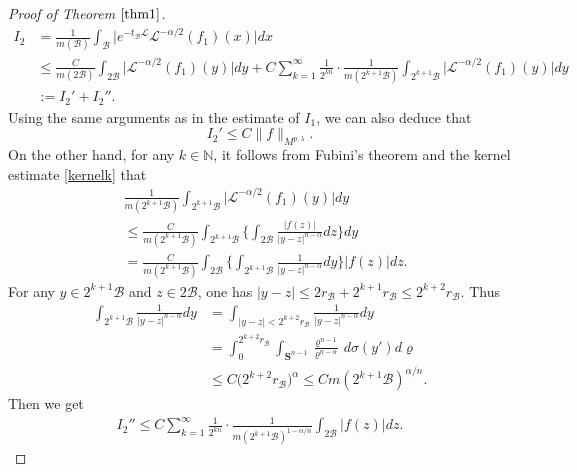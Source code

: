 \documentclass[10pt, reqno]{amsart}
\theoremstyle{definition}
\theoremstyle{remark}
\numberwithin{equation}{section}
\begin{document}
\begin{proof}[Proof of Theorem $\ref{thm1}$]
\begin{equation*}
\begin{split}
I_2&=\frac{1}{m(\mathcal{B})}\int_{\mathcal{B}}\big|e^{-t_{\mathcal{B}}\mathcal{L}}\mathcal{L}^{-\alpha/2}(f_1)(x)\big|dx\\
&\leq\frac{C}{m(2\mathcal{B})}\int_{2\mathcal{B}}\big|\mathcal{L}^{-\alpha/2}(f_1)(y)\big|dy
+C\sum_{k=1}^{\infty}\frac{1}{2^{kn}}\cdot\frac{1}{m(2^{k+1}\mathcal{B})}\int_{2^{k+1}\mathcal{B}}\big|\mathcal{L}^{-\alpha/2}(f_1)(y)\big|dy\\
&:=I_2'+I_2''.
\end{split}
\end{equation*}
Using the same arguments as in the estimate of $I_1$, we can also deduce that
\begin{equation*}
I_2'\leq C\big\|f\big\|_{M^{p,\lambda}}.
\end{equation*}
On the other hand, for any $k\in \mathbb{N}$, it follows from Fubini's theorem and the kernel estimate \eqref{kernelk} that
\begin{equation*}
\begin{split}
&\frac{1}{m(2^{k+1}\mathcal{B})}\int_{2^{k+1}\mathcal{B}}\big|\mathcal{L}^{-\alpha/2}(f_1)(y)\big|dy\\
&\leq \frac{C}{m(2^{k+1}\mathcal{B})}\int_{2^{k+1}\mathcal{B}}\bigg\{\int_{2\mathcal{B}}\frac{|f(z)|}{|y-z|^{n-\alpha}}dz\bigg\}dy\\
&=\frac{C}{m(2^{k+1}\mathcal{B})}\int_{2\mathcal{B}}\bigg\{\int_{2^{k+1}\mathcal{B}}\frac{1}{|y-z|^{n-\alpha}}dy\bigg\}|f(z)|dz.
\end{split}
\end{equation*}
For any $y\in 2^{k+1}\mathcal{B}$ and $z\in 2\mathcal{B}$, one has $|y-z|\leq 2r_{\mathcal{B}}+2^{k+1}r_{\mathcal{B}}\leq 2^{k+2}r_{\mathcal{B}}$. Thus
\begin{equation}\label{wang2}
\begin{split}
\int_{2^{k+1}\mathcal{B}}\frac{1}{|y-z|^{n-\alpha}}dy
&=\int_{|y-z|<2^{k+2}r_{\mathcal{B}}}\frac{1}{|y-z|^{n-\alpha}}dy\\
&=\int_0^{2^{k+2}r_{\mathcal{B}}}\int_{\mathbf{S}^{n-1}}\frac{\varrho^{n-1}}{\varrho^{n-\alpha}}\,d\sigma(y')d\varrho\\
&\leq C\big(2^{k+2}r_{\mathcal{B}}\big)^{\alpha}\leq Cm(2^{k+1}\mathcal{B})^{\alpha/n}.
\end{split}
\end{equation}
Then we get
\begin{equation*}
\begin{split}
I_2''\leq C\sum_{k=1}^{\infty}\frac{1}{2^{kn}}\cdot\frac{1}{m(2^{k+1}\mathcal{B})^{1-\alpha/n}}\int_{2\mathcal{B}}|f(z)|dz.

\end{split}
\end{equation*}
\end{proof}
\end{document}
